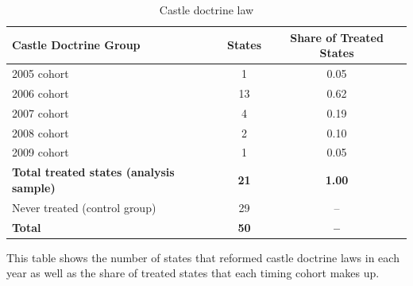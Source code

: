 \begin{table}[htbp]\centering
\footnotesize
\caption{Castle doctrine law}
\label{tab:municipalitybycohort}
\begin{threeparttable}
\begin{tabular}{lcc}
\toprule
\textbf{Castle Doctrine Group} & \textbf{States} & \textbf{Share of Treated States} \\
\midrule
2005 cohort &         1 & 0.05 \\
2006 cohort &        13 & 0.62 \\
2007 cohort &         4 & 0.19 \\
2008 cohort &         2 & 0.10 \\
2009 cohort &         1 & 0.05 \\
\midrule
\textbf{Total treated states (analysis sample)} & \textbf{       21} & \textbf{1.00} \\
\midrule
Never treated (control group) &        29 & -- \\
\midrule
\textbf{Total} & \textbf{       50} & \textbf{--} \\
\bottomrule
\end{tabular}
\begin{tablenotes}
\footnotesize
\item This table shows the number of states that reformed castle doctrine laws in each year as well as the share of treated states that each timing cohort makes up.
\end{tablenotes}
\end{threeparttable}
\end{table}
